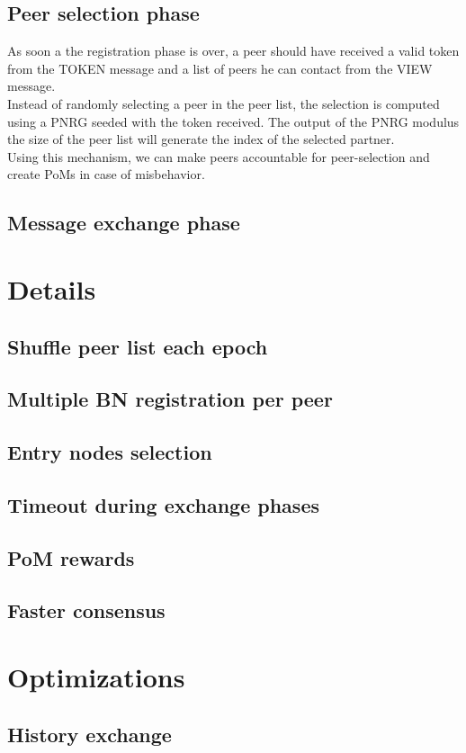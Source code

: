 \documentclass[mscthesis]{usiinfthesis}
\begin{document}
\subsection{Peer selection phase}
As soon a the registration phase is over, a peer should have received a valid token from the TOKEN message and a list of peers he can contact from the VIEW message. \\
Instead of randomly selecting a peer in the peer list, the selection is computed using a PNRG seeded with the token received. The output of the PNRG modulus the size of the peer list will generate the index of the selected partner. \\ 
Using this mechanism, we can make peers accountable for peer-selection and create PoMs in case of misbehavior. 
\subsection{Message exchange phase}
\section{Details}
\subsection{Shuffle peer list each epoch}
\subsection{Multiple BN registration per peer}
\subsection{Entry nodes selection}
\subsection{Timeout during exchange phases}
\subsection{PoM rewards}
\subsection{Faster consensus}
\section{Optimizations}
\subsection{History exchange}
\end{document}
